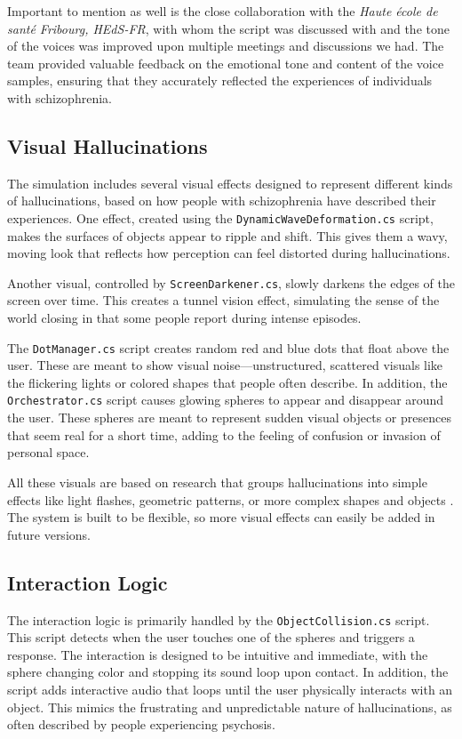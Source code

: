 Important to mention as well is the close collaboration with the \textit{Haute école de santé Fribourg, HEdS-FR}, with whom the script was discussed with and the tone of the voices was improved upon multiple meetings and discussions we had. The team provided valuable feedback on the emotional tone and content of the voice samples, ensuring that they accurately reflected the experiences of individuals with schizophrenia.
    
\subsection{Visual Hallucinations}

The simulation includes several visual effects designed to represent different kinds of hallucinations, based on how people with schizophrenia have described their experiences. One effect, created using the \texttt{DynamicWaveDeformation.cs} script, makes the surfaces of objects appear to ripple and shift. This gives them a wavy, moving look that reflects how perception can feel distorted during hallucinations.

Another visual, controlled by \texttt{ScreenDarkener.cs}, slowly darkens the edges of the screen over time. This creates a tunnel vision effect, simulating the sense of the world closing in that some people report during intense episodes.

The \texttt{DotManager.cs} script creates random red and blue dots that float above the user. These are meant to show visual noise—unstructured, scattered visuals like the flickering lights or colored shapes that people often describe. In addition, the \texttt{Orchestrator.cs} script causes glowing spheres to appear and disappear around the user. These spheres are meant to represent sudden visual objects or presences that seem real for a short time, adding to the feeling of confusion or invasion of personal space.

All these visuals are based on research that groups hallucinations into simple effects like light flashes, geometric patterns, or more complex shapes and objects \cite{Silverstein2021,Vanommen2019}. The system is built to be flexible, so more visual effects can easily be added in future versions.

\subsection{Interaction Logic}
The interaction logic is primarily handled by the \texttt{ObjectCollision.cs} script. This script detects when the user touches one of the spheres and triggers a response. The interaction is designed to be intuitive and immediate, with the sphere changing color and stopping its sound loop upon contact.  
In addition, the script adds interactive audio that loops until the user physically interacts with an object. This mimics the frustrating and unpredictable nature of hallucinations, as often described by people experiencing psychosis.

